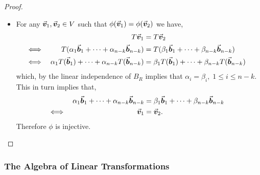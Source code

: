 \documentclass[../MathsNotesBase.tex]{subfiles}
\begin{document}
{\begin{proof}
\begin{itemize}
{					and, clearly, ${ \beta_1 \b_1 + \cdots + \beta_{n-k} \b_{n-k} \in \operatorname{span} B_{K'} }$. Therefore $\phi$ is surjective.
				}
				\item{For any ${ \vec{\bm{v}}_1, \vec{\bm{v}}_2 \in V }$ such that ${ \phi(\vec{\bm{v}}_1) = \phi(\vec{\bm{v}}_2) }$ we have,
					\[\begin{aligned}
						&& T\vec{\bm{v}}_1 &= T\vec{\bm{v}}_2 \\
						&\iff & T(\alpha_1 \vec{\bm{b}}_1 + \cdots + \alpha_{n-k} \vec{\bm{b}}_{n-k}) &= T(\beta_1 \vec{\bm{b}}_1 + \cdots + \beta_{n-k} \vec{\bm{b}}_{n-k}) &\text{\scriptsize{}} \\
						&\iff & \alpha_1 T(\vec{\bm{b}}_1) + \cdots + \alpha_{n-k} T(\vec{\bm{b}}_{n-k}) &= \beta_1 T(\vec{\bm{b}}_1) + \cdots + \beta_{n-k} T(\vec{\bm{b}}_{n-k})
					\end{aligned}\]
					which, by the linear independence of $B_R$ implies that ${ \alpha_i = \beta_i, \; 1 \leq i \leq n-k }$. This in turn implies that,
					\[\begin{aligned}
						&& \alpha_1 \vec{\bm{b}}_1 + \cdots + \alpha_{n-k} \vec{\bm{b}}_{n-k} &= \beta_1 \vec{\bm{b}}_1 + \cdots + \beta_{n-k} \vec{\bm{b}}_{n-k} \\
						&\iff & \vec{\bm{v}}_1 &= \vec{\bm{v}}_2. &\text{\scriptsize{}} \\
					\end{aligned}\]
					Therefore $\phi$ is injective. \qedhere
				}
			\end{itemize}
		\end{proof}

	
		\biggerskip
		\subsubsection{The Algebra of Linear Transformations}
		\bigskip
	
}
\end{document}
